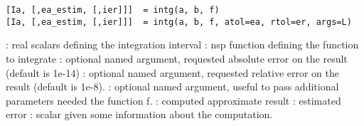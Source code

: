 
\begin{mandesc}
\end{mandesc}

\begin{calling_sequence}
\begin{verbatim}
[Ia, [,ea_estim, [,ier]]]  = intg(a, b, f)
[Ia, [,ea_estim, [,ier]]]  = intg(a, b, f, atol=ea, rtol=er, args=L)
\end{verbatim}
\end{calling_sequence}
\begin{parameters}
  \begin{varlist}
    :  real scalars defining the integration interval
    : nsp function defining the function to integrate
    : optional named argument, requested absolute error
                      on the result (default is 1e-14)
    : optional named argument, requested relative error
                      on the result (default is 1e-8).
    : optional named argument, useful to pass
    additional parameters needed the function f.
    : computed approximate result
    : estimated error
    : scalar given some information about the computation.
  \end{varlist}
\end{parameters}

